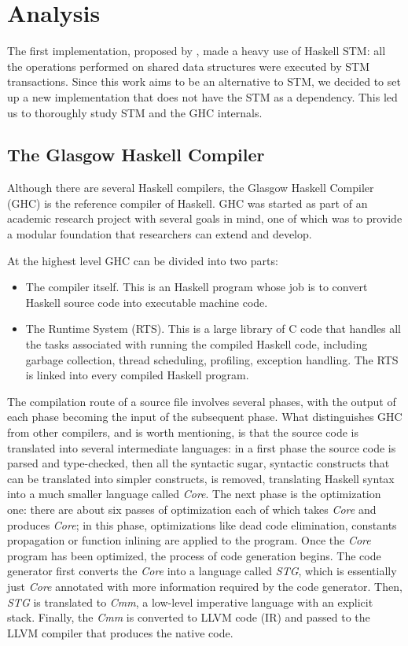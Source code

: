 
\chapter{Analysis}

The first implementation, proposed by \citet{Toneguzzo}, made a heavy use of Haskell STM: all the operations performed on shared data structures were executed by STM transactions. Since this work aims to be an alternative to STM, we decided to set up a new implementation that does not have the STM as a dependency. This led us to thoroughly study STM and the GHC internals.


\section{The Glasgow Haskell Compiler}
Although there are several Haskell compilers, the Glasgow Haskell Compiler (GHC) is the reference compiler of Haskell. GHC was started as part of an academic research project with several goals in mind, one of which was to provide a modular foundation that researchers can extend and develop.

At the highest level GHC can be divided into two parts:
\begin{itemize}
 \item The compiler itself. This is an Haskell program whose job is to convert Haskell source code into executable machine code.
 \item The Runtime System (RTS). This is a large library of C code that handles all the tasks associated with running the compiled Haskell code, including garbage collection, thread scheduling, profiling, exception handling. The RTS is linked into every compiled Haskell program.
 \end{itemize}
The compilation route of a source file involves several phases, with the output of each phase becoming the input of the subsequent phase. What distinguishes GHC from other compilers, and is worth mentioning, is that the source code is translated into several intermediate languages: in a first phase the source code is parsed and type-checked, then all the syntactic sugar, \ie syntactic constructs that can be translated into simpler constructs, is removed, translating Haskell syntax into a much smaller language called \emph{Core}. The next phase is the optimization one: there are about six passes of optimization each of which takes \emph{Core} and produces \emph{Core}; in this phase, optimizations like dead code elimination, constants propagation or function inlining are applied to the program. Once the \emph{Core} program has been optimized, the process of code generation begins. The code generator first converts the \emph{Core} into a language called \emph{STG}, which is essentially just \emph{Core} annotated with more information required by the code generator. Then, \emph{STG} is translated to \emph{Cmm}, a low-level imperative language with an explicit stack. Finally, the \emph{Cmm} is converted to LLVM code (IR) and passed to the LLVM compiler that produces the native code.

